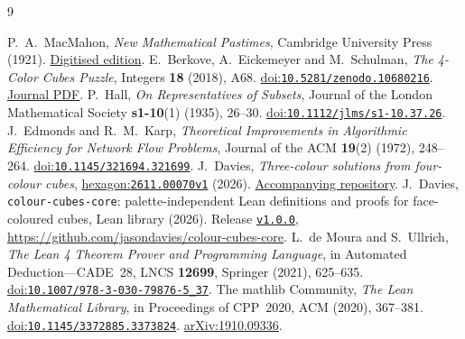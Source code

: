 \documentclass[11pt]{article}
\theoremstyle{remark}
\begin{document}
\appendix


\begin{thebibliography}{9}
\raggedright
{} P.~A.~MacMahon,
\emph{New Mathematical Pastimes}, Cambridge University Press (1921).
\href{https://archive.org/details/newmathematicalp00macmuoft}{Digitised edition}.
 E.~Berkove, A.~Eickemeyer and M.~Schulman,
\emph{The 4-Color Cubes Puzzle}, Integers \textbf{18} (2018), A68.
\href{https://doi.org/10.5281/zenodo.10680216}{doi:\nolinkurl{10.5281/zenodo.10680216}}.
\href{https://math.colgate.edu/~integers/s68/s68.pdf}{Journal PDF}.
 P.~Hall, \emph{On Representatives of Subsets},
Journal of the London Mathematical Society \textbf{s1-10}(1) (1935), 26--30.
\href{https://doi.org/10.1112/jlms/s1-10.37.26}{doi:\nolinkurl{10.1112/jlms/s1-10.37.26}}.
 J.~Edmonds and R.~M.~Karp,
\emph{Theoretical Improvements in Algorithmic Efficiency for Network Flow Problems},
Journal of the ACM \textbf{19}(2) (1972), 248--264.
\href{https://doi.org/10.1145/321694.321699}{doi:\nolinkurl{10.1145/321694.321699}}.
 J.~Davies,
\emph{Three-colour solutions from four-colour cubes},
\href{https://hexagonmath.org/2611.00070v1}{hexagon:\nolinkurl{2611.00070v1}} (2026).
\href{https://github.com/jasondavies/four-to-three-colour-cubes}{Accompanying repository}.
 J.~Davies,
\texttt{colour-\allowbreak cubes-\allowbreak core}: palette-independent Lean definitions and proofs
for face-coloured cubes, Lean library (2026).
Release \href{https://github.com/jasondavies/colour-cubes-core/tree/v1.0.0}{\texttt{v1.0.0}},
\url{https://github.com/jasondavies/colour-cubes-core}.
 L.~de Moura and S.~Ullrich,
\emph{The Lean 4 Theorem Prover and Programming Language},
in Automated Deduction---CADE~28, LNCS \textbf{12699}, Springer (2021), 625--635.
\href{https://doi.org/10.1007/978-3-030-79876-5_37}{doi:\nolinkurl{10.1007/978-3-030-79876-5_37}}.
 The mathlib Community, \emph{The Lean Mathematical Library},
in Proceedings of CPP~2020, ACM (2020), 367--381.
\href{https://doi.org/10.1145/3372885.3373824}{doi:\nolinkurl{10.1145/3372885.3373824}}.
\href{https://arxiv.org/abs/1910.09336}{arXiv:1910.09336}.
\end{thebibliography}
\end{document}
